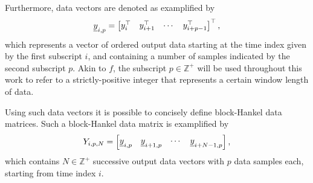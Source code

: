 Furthermore, data vectors are denoted as examplified by
\begin{align*}
    \underline{y}_{i,p} = \begin{bmatrix} y_i^\top & y_{i+1}^\top & \cdots & y_{i+p-1}^\top\end{bmatrix}^\top,
\end{align*}
which represents a vector of ordered output data starting at the time index given by the first subscript $i$, and containing a number of samples indicated by the second subscript $p$. Akin to $f$, the subscript $p\in\mathbb{Z}^+$ will be used throughout this work to refer to a strictly-positive integer that represents a certain window length of data.

Using such data vectors it is possible to concisely define block-Hankel data matrices. Such a block-Hankel data matrix is examplified by
\begin{align*}
    Y_{i,p,N} = \begin{bmatrix}
        \underline{y}_{i,p} & \underline{y}_{i+1,p} & \cdots & \underline{y}_{i+N-1,p}
    \end{bmatrix},
\end{align*}
which contains $N\in\mathbb{Z}^+$ successive output data vectors with $p$ data samples each, starting from time index $i$.